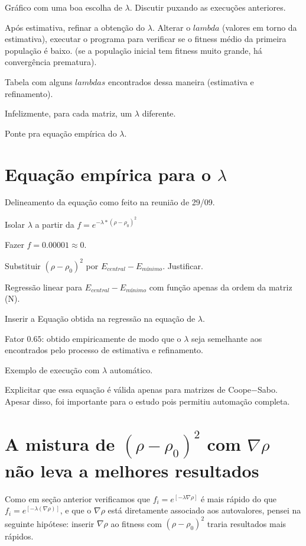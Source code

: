 	Gráfico com uma boa escolha de $\lambda$. Discutir puxando as execuções anteriores.
	
	Após estimativa, refinar a obtenção do $\lambda$. Alterar o $lambda$ (valores em torno da estimativa), executar o programa para verificar se o fitness médio da primeira população é baixo. (se a população inicial tem fitness muito grande, há convergência prematura).
	
	Tabela com alguns $lambdas$ encontrados dessa maneira (estimativa e refinamento).
	
	Infelizmente, para cada matriz, um $\lambda$ diferente.
	
	Ponte pra equação empírica do $\lambda$.

	\section{Equação empírica para o $\lambda$}\label{sec:eq_lambda}
	
	Delineamento da equação como feito na reunião de 29/09.
	
	Isolar $\lambda$ a partir da $f=e^{-\lambda*(\rho - \rho_0)^2}$
	
	Fazer $f = 0.00001 \approx 0$.
	
	Substituir $(\rho - \rho_0)^2$ por $E_{central} - E_{mínimo}$. Justificar.
	
	Regressão linear para $E_{central} - E_{mínimo}$ com função apenas da ordem da matriz (N).
	
	Inserir a Equação obtida na regressão na equação de $\lambda$.
	
	Fator $0.65$: obtido empiricamente de modo que o $\lambda$ seja semelhante aos encontrados pelo processo de estimativa e refinamento.
	
	Exemplo de execução com $\lambda$ automático.
	
	Explicitar que essa equação é válida apenas para matrizes de Coope$-$Sabo. Apesar disso, foi importante para o estudo pois permitiu automação completa.
		
	\section{A mistura de $(\rho - \rho_0)^2$ com $\nabla\rho$ não leva a melhores resultados}
	
	Como em seção anterior verificamos que $f_i = e^{[-\lambda \nabla \rho]}$ é mais rápido do que $f_i = e^{[-\lambda (\nabla \rho)]}$, e que o $\nabla\rho$ está diretamente associado aos autovalores, pensei na seguinte hipótese: inserir $\nabla \rho$ ao fitness com $(\rho - \rho_0)^2$ traria resultados mais rápidos.
	
